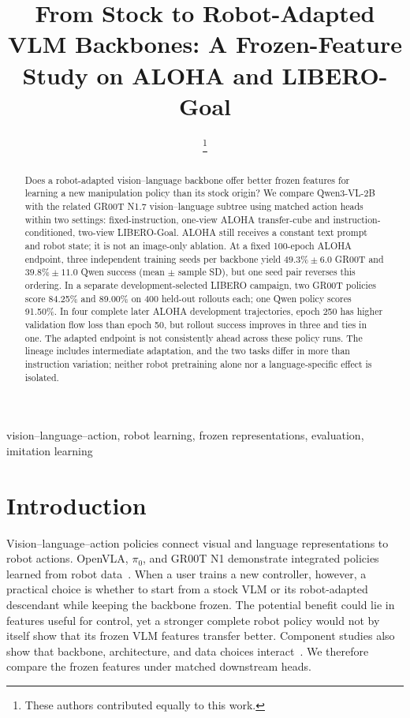\documentclass[conference]{IEEEtran}
\title{From Stock to Robot-Adapted VLM Backbones: A Frozen-Feature Study on ALOHA and LIBERO-Goal}
\author{\IEEEauthorblockN{Sittipon Kumda\IEEEauthorrefmark{1} and Rachata Pratheep Na Thalang\IEEEauthorrefmark{1}}\IEEEauthorblockA{King Mongkut's Institute of Technology Ladkrabang\\Thailand\\sittiponkumda@gmail.com, pratheepg49@gmail.com}\thanks{\IEEEauthorrefmark{1}These authors contributed equally to this work.}}
\begin{document}
\maketitle
\begin{abstract}
Does a robot-adapted vision--language backbone offer better frozen features
for learning a new manipulation policy than its stock origin? We compare
Qwen3-VL-2B with the related GR00T N1.7 vision--language subtree using matched
action heads within two settings: fixed-instruction, one-view ALOHA
transfer-cube and instruction-conditioned, two-view LIBERO-Goal. ALOHA still
receives a constant text prompt and robot state; it is not an image-only
ablation. At a fixed 100-epoch ALOHA endpoint, three independent training
seeds per backbone yield $49.3\%\pm6.0$ GR00T and $39.8\%\pm11.0$ Qwen
success (mean $\pm$ sample SD), but one seed pair reverses this ordering.
In a separate development-selected LIBERO campaign, two GR00T policies score
84.25\% and 89.00\% on 400 held-out rollouts each; one Qwen
policy scores 91.50\%. In four complete later ALOHA development trajectories,
epoch 250 has higher validation flow loss than epoch 50, but rollout success
improves in three and ties in one. The adapted endpoint is not consistently
ahead across these policy runs. The lineage includes intermediate adaptation, and
the two tasks differ in more than instruction variation; neither robot
pretraining alone nor a language-specific effect is isolated.
\end{abstract}
\begin{IEEEkeywords}
vision--language--action, robot learning, frozen representations, evaluation,
imitation learning
\end{IEEEkeywords}

\section{Introduction}
Vision--language--action policies connect visual and language representations
to robot actions. OpenVLA, $\pi_0$, and GR00T N1 demonstrate integrated
policies learned from robot data~\cite{openvla,pi0,grootn1}. When a user
trains a new controller, however, a practical choice is whether to start
from a stock VLM or its robot-adapted descendant while keeping the backbone
frozen. The potential benefit could lie in features useful for control,
yet a stronger complete robot policy would not by itself show that its
frozen VLM features transfer better. Component studies also show that
backbone, architecture, and data choices interact~\cite{robovlms}. We
therefore compare the frozen features under matched downstream heads.
\end{document}
